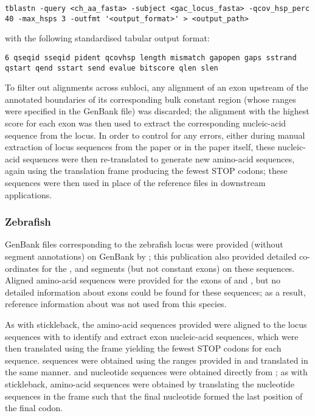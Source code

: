 \begin{lstlisting}
tblastn -query <ch_aa_fasta> -subject <gac_locus_fasta> -qcov_hsp_perc 40 -max_hsps 3 -outfmt '<output_format>' > <output_path>
\end{lstlisting}

\noindent with the following standardised tabular output format: 

\begin{lstlisting}
6 qseqid sseqid pident qcovhsp length mismatch gapopen gaps sstrand qstart qend sstart send evalue bitscore qlen slen
\end{lstlisting}

To filter out alignments across subloci, any alignment of an exon upstream of the annotated boundaries of its corresponding bulk constant region (whose ranges were specified in the GenBank file) was discarded; the alignment with the highest score for each exon was then used to extract the corresponding nucleic-acid sequence from the locus. In order to control for any errors, either during manual extraction of locus sequences from the paper or in the paper itself, these nucleic-acid sequences were then re-translated to generate new amino-acid sequences, again using the translation frame producing the fewest STOP codons; these sequences were then used in place of the reference files in downstream applications.

\subsubsection{Zebrafish}
\label{sec:ref_locus_dre}

GenBank files corresponding to the zebrafish \igh{} locus were provided (without segment annotations) on GenBank by \parencite{danilova2005zebrafish}; this publication also provided detailed co-ordinates for the \vh, \dh and \jh segments (but not constant exons) on these sequences. Aligned amino-acid sequences were provided for the exons of  and , but no detailed information about  exons could be found for these sequences; as a result, reference information about  was not used from this species.

As with stickleback, the amino-acid sequences provided were aligned to the locus sequences  with  to identify and extract exon nucleic-acid sequences, which were then translated using the frame yielding the fewest STOP codons for each sequence. \vh sequences were obtained using the ranges provided in \parencite{danilova2005zebrafish} and translated in the same manner. \dh and \jh nucleotide sequences were obtained directly from \parencite{danilova2005zebrafish}; as with stickleback, \jh amino-acid sequences were obtained by translating the nucleotide sequences in the frame such that the final nucleotide formed the last position of the final codon.

